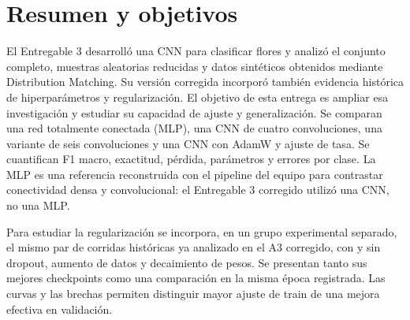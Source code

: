\section{Resumen y objetivos}
El Entregable 3 desarrolló una CNN para clasificar flores y analizó el conjunto
completo, muestras aleatorias reducidas y datos sintéticos obtenidos mediante
Distribution Matching. Su versión corregida incorporó también evidencia histórica
de hiperparámetros y regularización. El objetivo de esta entrega es ampliar esa
investigación y estudiar
su capacidad de ajuste y generalización. Se comparan una red totalmente conectada
(MLP), una CNN de cuatro convoluciones, una variante de seis convoluciones y
una CNN con AdamW y ajuste de tasa. Se cuantifican F1 macro, exactitud, pérdida,
parámetros y errores por clase. La MLP es una referencia reconstruida con el
pipeline del equipo para contrastar conectividad densa y convolucional: el
Entregable 3 corregido utilizó una CNN, no una MLP.

Para estudiar la regularización se incorpora, en un grupo experimental separado,
el mismo par de corridas históricas ya analizado en el A3 corregido, con y sin dropout, aumento de datos y decaimiento
de pesos. Se presentan tanto sus mejores checkpoints como una comparación en
la misma época registrada. Las curvas y las brechas permiten distinguir mayor
ajuste de train de una mejora efectiva en validación.
